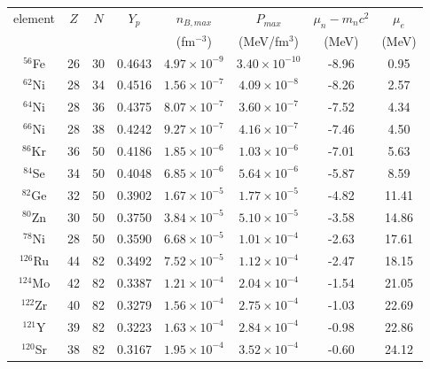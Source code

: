 \begin{table}[!t]
\begin{center}
\begin{tabular}{cccccccc} 
  \toprule
  \toprule
  element   & $Z$ & $N$ & $Y_p$  & $n_{B,max}$       & $P_{max}$    & $\mu_n - m_nc^2$ & $\mu_e$ \\ 
            &     &     &        & (fm$^{-3}$)       & (MeV/fm$^3$) & (MeV)            & (MeV)   \\
  \midrule
  $^{56}$Fe & 26  & 30  & 0.4643 & $4.97\times 10^{-9}$ & $3.40\times 10^{-10}$
            & -8.96 & 0.95 \\
  $^{62}$Ni & 28  & 34  & 0.4516 & $1.56\times 10^{-7}$ & $4.09\times 10^{-8}$
            & -8.26 & 2.57 \\
  $^{64}$Ni & 28  & 36  & 0.4375 & $8.07\times 10^{-7}$ & $3.60\times 10^{-7}$
            & -7.52 & 4.34 \\
  $^{66}$Ni & 28  & 38  & 0.4242 & $9.27\times 10^{-7}$ & $4.16\times 10^{-7}$
            & -7.46 & 4.50 \\
  $^{86}$Kr & 36  & 50  & 0.4186 & $1.85\times 10^{-6}$ & $1.03\times 10^{-6}$
            & -7.01 & 5.63 \\
  $^{84}$Se & 34  & 50  & 0.4048 & $6.85\times 10^{-6}$ & $5.64\times 10^{-6}$
            & -5.87 & 8.59 \\
  $^{82}$Ge & 32  & 50  & 0.3902 & $1.67\times 10^{-5}$ & $1.77\times 10^{-5}$
            & -4.82 & 11.41 \\
  $^{80}$Zn & 30  & 50  & 0.3750 & $3.84\times 10^{-5}$ & $5.10\times 10^{-5}$
            & -3.58 & 14.86 \\
            \midrule
  $^{78}$Ni & 28  & 50  & 0.3590 & $6.68\times 10^{-5}$ & $1.01\times 10^{-4}$
            & -2.63 & 17.61 \\
  $^{126}$Ru & 44  & 82  & 0.3492 & $7.52\times 10^{-5}$ & $1.12\times 10^{-4}$
            & -2.47 & 18.15 \\
  $^{124}$Mo & 42  & 82  & 0.3387 & $1.21\times 10^{-4}$ & $2.04\times 10^{-4}$
            & -1.54 & 21.05 \\
  $^{122}$Zr & 40  & 82  & 0.3279 & $1.56\times 10^{-4}$ & $2.75\times 10^{-4}$
            & -1.03 & 22.69 \\
  $^{121}$Y  & 39  & 82  & 0.3223 & $1.63\times 10^{-4}$ & $2.84\times 10^{-4}$
            & -0.98 & 22.86 \\
  $^{120}$Sr & 38  & 82  & 0.3167 & $1.95\times 10^{-4}$ & $3.52\times 10^{-4}$
            & -0.60 & 24.12 \\

\end{tabular}
\end{center}
\end{table}
